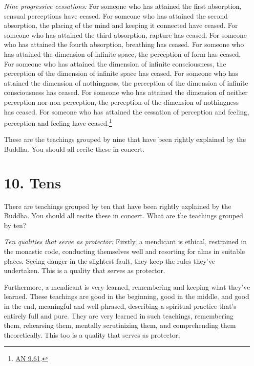 \documentclass[12pt,openany]{book}%
\begin{document}
\emph{Nine progressive cessations:} For someone who has attained the first absorption, sensual perceptions have ceased. For someone who has attained the second absorption, the placing of the mind and keeping it connected have ceased. For someone who has attained the third absorption, rapture has ceased. For someone who has attained the fourth absorption, breathing has ceased. For someone who has attained the dimension of infinite space, the perception of form has ceased. For someone who has attained the dimension of infinite consciousness, the perception of the dimension of infinite space has ceased. For someone who has attained the dimension of nothingness, the perception of the dimension of infinite consciousness has ceased. For someone who has attained the dimension of neither perception nor non-perception, the perception of the dimension of nothingness has ceased. For someone who has attained the cessation of perception and feeling, perception and feeling have ceased.\footnote{\href{https://suttacentral.net/an9.61/en/sujato}{AN 9.61}. } 

These are the teachings grouped by nine that have been rightly explained by the Buddha. You should all recite these in concert. 

\section*{10. Tens }

There are teachings grouped by ten that have been rightly explained by the Buddha. You should all recite these in concert. What are the teachings grouped by ten? 

\emph{Ten qualities that serve as protector:} Firstly, a mendicant is ethical, restrained in the monastic code, conducting themselves well and resorting for alms in suitable places. Seeing danger in the slightest fault, they keep the rules they’ve undertaken. This is a quality that serves as protector. 

Furthermore, a mendicant is very learned, remembering and keeping what they’ve learned. These teachings are good in the beginning, good in the middle, and good in the end, meaningful and well-phrased, describing a spiritual practice that’s entirely full and pure. They are very learned in such teachings, remembering them, rehearsing them, mentally scrutinizing them, and comprehending them theoretically. This too is a quality that serves as protector. 
\end{document}
